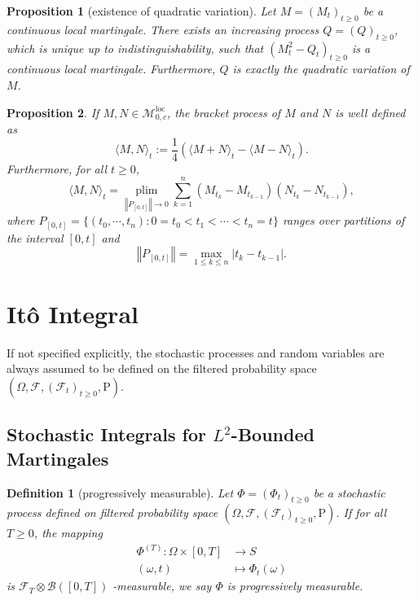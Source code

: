 \documentclass{article}
\newtheorem{definition}{Definition}[section]
\newtheorem{proposition}{Proposition}[section]
\theoremstyle{nonumberplain}
\begin{document}
\begin{proposition}[existence of quadratic variation]	
	Let $M=\left(M_{t}\right)_{t \geq 0}$ be a continuous local martingale. There exists an	increasing process $Q=\left(Q\right)_{t \geq 0}$, which is unique up to indistinguishability, such that $(M_{t}^{2}-Q_{t})_{t \geq 0}$ is a continuous local martingale. Furthermore, $Q$ is exactly the quadratic variation of $M$.
\end{proposition}

\begin{proposition}
	If $M,N\in \mathscr{M}^{\mathrm{loc}}_{0,c}$, the bracket process of $M$ and $N$ is well defined as
	\[
	\langle M, N\rangle_{t}:=\frac{1}{4}\left(\langle M+N\rangle_{t}-\langle M-N\rangle_{t}\right).
	\]
	Furthermore, for all $t\ge0$,
	\[
	\langle M, N\rangle_{t}=\mathop{\mathrm{plim}}\limits_{\left\Vert P_{[0,t]}\right\Vert \rightarrow 0} \sum_{k=1}^{n}\left(M_{t_{k}}-M_{t_{k-1}}\right)\left(N_{t_{k}}-N_{t_{k-1}}\right),
	\]
	where $P_{[0,t]}=\{(t_0,\cdots,t_n):0=t_0<t_1<\cdots<t_n=t\}$ ranges over partitions of the interval $[0,t]$ and 
	\[
	\left\Vert P_{[0,t]}\right\Vert=\max\limits_{1\le k\le n}{|t_k-t_{k-1}|}.
	\]
\end{proposition}



\section{Itô Integral}
If not specified explicitly, the stochastic processes and random variables are always assumed to be defined on the filtered probability space $(\Omega,\mathcal{F},(\mathcal{F}_{t})_{t\ge0},\mathrm{P})$.
\subsection{Stochastic Integrals for $L^2$-Bounded Martingales}
\begin{definition}[progressively measurable]
	Let $\Phi=(\Phi_t)_{t\ge0}$ be a stochastic process defined on filtered probability space $(\Omega,\mathcal{F},(\mathcal{F}_{t})_{t\ge0},\mathrm{P})$. If for all $T\ge0$, the mapping
	\begin{align*}
	\Phi^{(T)}: \Omega \times [0, T]&\longrightarrow S\\
	(\omega,t)&\longmapsto \Phi_t(\omega)
	\end{align*}
	is $\mathcal{F}_T\otimes \mathcal{B}([0,T])$ -measurable, we say $\Phi$ is \emph{progressively measurable}.
\end{definition}
\end{document}
